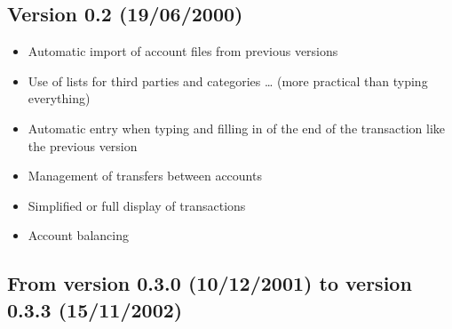 \subsection{Version 0.2 \textnormal{(19/06/2000)}}

\begin{itemize}
	\item Automatic import of account files from previous versions%
	\item Use of lists for third parties and categories \dots{} (more practical than typing everything)%
	\item Automatic entry when typing and filling in of the end of the transaction like the previous version%
	\item Management of transfers between accounts%
	\item Simplified or full display of transactions%
	\item Account balancing%
\end{itemize}

\subsection{From version 0.3.0 \textnormal{(10/12/2001)} to version 0.3.3 \textnormal{(15/11/2002)}}%

